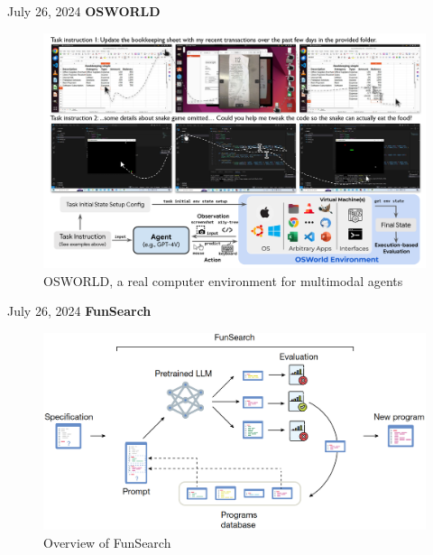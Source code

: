 \documentclass[10pt]{beamer}
\begin{document}
\begin{frame}{July 26, 2024}
    \textbf{OSWORLD}
    \begin{figure}
        \centering
        \includegraphics[width=\textwidth]{Fig/2024.7.26_2.png}
        \caption{OSWORLD, a real computer environment for multimodal agents}
        \label{fig:my_label}
    \end{figure}
\end{frame}

\begin{frame}{July 26, 2024}
    \textbf{FunSearch}
    \begin{figure}
        \centering
        \includegraphics[width=\textwidth]{Fig/2024.7.26_1.png}
        \caption{Overview of FunSearch}
        \label{fig:my_label}
    \end{figure}
\end{frame}
\end{document}
